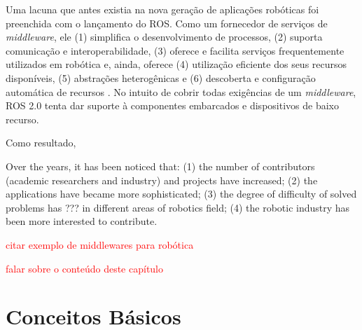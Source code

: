     Uma lacuna que antes existia na nova geração de aplicações robóticas foi preenchida com o lançamento do ROS. Como um fornecedor de serviços de \textit{middleware}, ele (1) simplifica o desenvolvimento de processos, (2) suporta comunicação e interoperabilidade, (3) oferece e facilita serviços frequentemente utilizados em robótica e, ainda, oferece (4) utilização eficiente dos seus recursos disponíveis, (5) abstrações heterogênicas e (6) descoberta e configuração automática de recursos \cite{ref:quigley2009ros}. No intuito de cobrir todas exigências de um \textit{middleware}, ROS 2.0 tenta dar suporte à componentes embarcados e dispositivos de baixo recurso.
    
    Como resultado, 
    
    Over the years, it has been noticed that:
	(1) the number of contributors (academic researchers and industry) and projects have increased;
	(2) the applications have became more sophisticated;
	(3) the degree of difficulty of solved problems has ??? in different areas of robotics field;
	(4) the robotic industry has been more interested to contribute.
	
	\textcolor{red}{citar exemplo de middlewares para robótica}
    
    \textcolor{red}{falar sobre o conteúdo deste capítulo}
    
    \section{Conceitos Básicos} \label{sec:ros_conceitos}
    
    